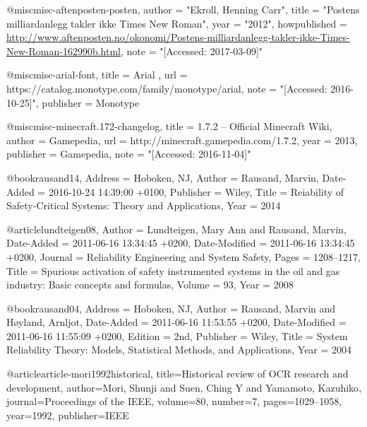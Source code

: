 @misc{misc-aftenposten-posten,
    author =       "Ekroll, Henning Carr",
    title =        "Postens milliardanlegg takler ikke Times New Roman",
    year =         "2012",
    howpublished = {\url{http://www.aftenposten.no/okonomi/Postens-milliardanlegg-takler-ikke-Times-New-Roman-162990b.html}},
    note =         "[Accessed: 2017-03-09]"
}




@misc{misc-arial-font,
    title =         {Arial {\textsuperscript{\textregistered}}},
    url =           {https://catalog.monotype.com/family/monotype/arial},
    note =          "[Accessed: 2016-10-25]",
    publisher =     {Monotype}
}

@misc{misc-minecraft.172-changelog,
    title =         {1.7.2 – Official Minecraft Wiki},
    author =        {Gamepedia},
    url =           {http://minecraft.gamepedia.com/1.7.2},
    year =          {2013},
    publisher =     {Gamepedia},
    note =          "[Accessed: 2016-11-04]"
}


@book{rausand14,
	Address = {Hoboken, NJ},
	Author = {Rausand, Marvin},
	Date-Added = {2016-10-24 14:39:00 +0100},
	Publisher = {Wiley},
	Title = {Reiability of Safety-Critical Systems: Theory and Applications},
	Year = {2014}}

@article{lundteigen08,
	Author = {Lundteigen, Mary Ann and Rausand, Marvin},
	Date-Added = {2011-06-16 13:34:45 +0200},
	Date-Modified = {2011-06-16 13:34:45 +0200},
	Journal = {Reliability Engineering and System Safety},
	Pages = {1208--1217},
	Title = {Spurious activation of safety instrumented systems in the oil and gas industry: Basic concepts and formulas},
	Volume = {93},
	Year = {2008}
}

@book{rausand04,
	Address = {Hoboken, NJ},
	Author = {Rausand, Marvin and H{\o}yland, Arnljot},
	Date-Added = {2011-06-16 11:53:55 +0200},
	Date-Modified = {2011-06-16 11:55:09 +0200},
	Edition = {2nd},
	Publisher = {Wiley},
	Title = {System Reliability Theory: Models, Statistical Methods, and Applications},
	Year = {2004}
}

@article{article-mori1992historical,
    title={Historical review of OCR research and development},
    author={Mori, Shunji and Suen, Ching Y and Yamamoto, Kazuhiko},
    journal={Proceedings of the IEEE},
    volume={80},
    number={7},
    pages={1029--1058},
    year={1992},
    publisher={IEEE}
}

